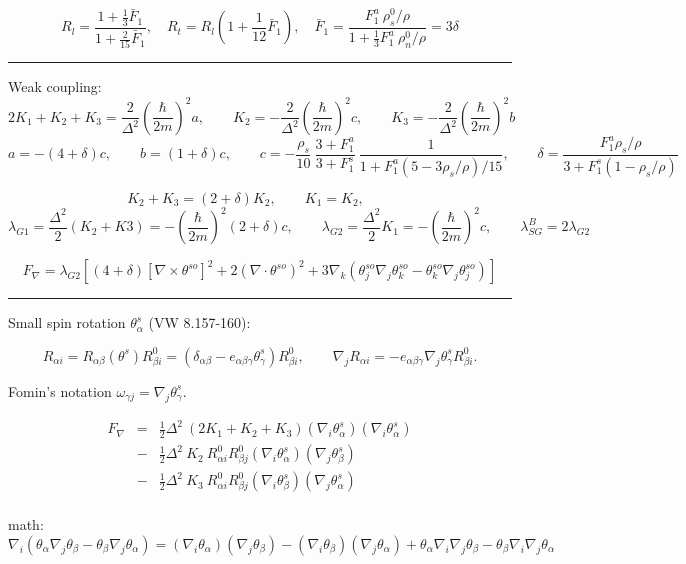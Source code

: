 \documentclass[a4paper]{article}
\begin{document}
$$
R_l = \frac{1+\frac13 \bar F_1}{1+ \frac{2}{15} \bar F_1},
\quad
R_t = R_l (1 + \frac{1}{12}\bar F_1),
\quad
\bar F_1 = \frac{F^a_1\ \rho_s^0/\rho}{1 + \frac13 F^a_1\ \rho_n^0/\rho} = 3\delta
$$

\hrule
\medskip


Weak coupling:
$$
2 K_1 + K_2 + K_3 = \frac{2}{\Delta^2}\left(\frac{\hbar}{2m}\right)^2 a,
\qquad
K_2 = -\frac{2}{\Delta^2}\left(\frac{\hbar}{2m}\right)^2 c,
\qquad
K_3 = -\frac{2}{\Delta^2}\left(\frac{\hbar}{2m}\right)^2 b
$$
$$
a=-(4+\delta)c,\qquad
b= (1+\delta)c,\qquad
c=-\frac{\rho_s}{10}
\ \frac{3+F_1^a}{3+F_1^s}
\ \frac{1}{1+F_1^a(5-3\rho_s/\rho)/15}
,\qquad
\delta = \frac{F_1^a \rho_s/\rho}{3+F_1^s(1-\rho_s/\rho)}
$$

$$
K_2+K_3 = (2+\delta)K_2,\qquad
K_1=K_2,\qquad
$$
$$
\lambda_{G1} = \frac{\Delta^2}{2}(K_2+K3) = -\left(\frac{\hbar}{2m}\right)^2 (2+\delta) c,\qquad
\lambda_{G2} = \frac{\Delta^2}{2}K_1 = -\left(\frac{\hbar}{2m}\right)^2 c,\qquad
\lambda_{SG}^B = 2\lambda_{G2}
$$

$$
F_\nabla = \lambda_{G2} \left[
   (4+\delta) [\nabla \times \theta^{so}]^2
  + 2 (\nabla \cdot \theta^{so})^2
  + 3 \nabla_k(\theta^{so}_j \nabla_j\theta^{so}_k - \theta^{so}_k \nabla_j\theta^{so}_j)
\right]
$$

\eject
\hrule
\medskip

Small spin rotation $\theta^s_\alpha$ (VW 8.157-160):

$$
R_{\alpha i} = R_{\alpha\beta}(\theta^s) R^0_{\beta i} =
(\delta_{\alpha\beta} - e_{\alpha\beta \gamma}\theta^s_\gamma) R^0_{\beta i},
\qquad
\nabla_j R_{\alpha i} = 
- e_{\alpha\beta \gamma}\nabla_j \theta^s_\gamma R^0_{\beta i}.
$$

Fomin's notation $\omega_{\gamma j} = \nabla_j \theta^s_\gamma$.

\begin{eqnarray*}
F_\nabla
&=& \frac12 \Delta^2\ (2 K_1 + K_2 + K_3)
(\nabla_i\theta^s_\alpha) (\nabla_i\theta^s_\alpha)\\
&-& \frac12 \Delta^2\  K_2
\ R^0_{\alpha i}R^0_{\beta j}(\nabla_i\theta^s_\alpha)(\nabla_j\theta^s_\beta)\\
&-& \frac12 \Delta^2\ K_3
\ R^0_{\alpha i}R^0_{\beta j}(\nabla_i\theta^s_\beta) (\nabla_j\theta^s_\alpha)\\
\end{eqnarray*}

math:
$$
\nabla_i(\theta_\alpha \nabla_j\theta_\beta - \theta_\beta \nabla_j\theta_\alpha) =
(\nabla_i\theta_\alpha)(\nabla_j\theta_\beta) -(\nabla_i\theta_\beta) (\nabla_j\theta_\alpha)
+ \theta_\alpha \nabla_i\nabla_j\theta_\beta - \theta_\beta \nabla_i\nabla_j\theta_\alpha
$$
\end{document}
